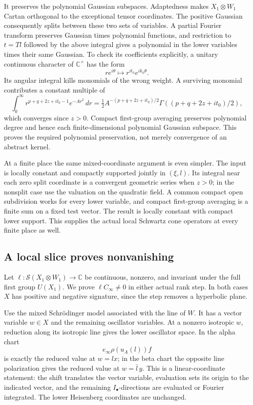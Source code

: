 It preserves the polynomial Gaussian subspaces.
Adaptedness makes \(X_1\otimes W_1\) Cartan orthogonal
to the exceptional tensor coordinates. The positive
Gaussian consequently splits between these two sets
of variables. A partial Fourier transform preserves
Gaussian times polynomial functions, and restriction
to \(t=Tl\) followed by the above integral gives
a polynomial in the lower variables times their
same Gaussian. To check its coefficients explicitly,
a unitary continuous character of \(\mathbb C^\times\)
has the form
\[
               r e^{i\theta}\longmapsto r^{i t_0}e^{i k_0\theta}.
\]
Its angular integral kills monomials of the wrong
weight. A surviving monomial contributes a constant
multiple of
\[
       \int_0^\infty
              r^{p+q+2z+i t_0-1}e^{-A r^2}\,dr
       =\tfrac12 A^{-(p+q+2z+i t_0)/2}
                          \Gamma((p+q+2z+i t_0)/2),
\]
which converges since \(z>0\).
Compact first-group averaging preserves polynomial
degree and hence each finite-dimensional polynomial
Gaussian subspace. This proves the required polynomial
preservation, not merely convergence of an abstract kernel.

At a finite place the same mixed-coordinate argument is
even simpler. The input is locally constant and compactly
supported jointly in \((\xi,l)\). Its integral near each
zero split coordinate is a convergent geometric series
when \(z>0\); in the nonsplit case use the valuation on
the quadratic field. A common compact open subdivision
works for every lower variable, and compact first-group
averaging is a finite sum on a fixed test vector.
The result is locally constant with compact lower
support. This supplies the actual local Schwartz cone
operators at every finite place as well.

\subsection{A local slice proves nonvanishing}

Let \(\ell:\mathcal S(X_1\otimes W_1)\to\mathbb C\)
be continuous, nonzero, and invariant under the full
first group \(U(X_1)\). We prove
\(\ell C_\infty\ne0\) in either actual rank step.
In both cases \(X\) has positive and negative
signature, since the step removes a hyperbolic plane.

Use the mixed Schr\"odinger model associated with the
line of \(W\). It has a vector variable \(w\in X\)
and the remaining oscillator variables. At a nonzero
isotropic \(w\), reduction along its isotropic line
gives the lower oscillator space. In the alpha chart
\[
             e_\infty\rho(u_A(l))f
\]
is exactly the reduced value at \(w=lx\); in the beta
chart the opposite line polarization gives the
reduced value at \(w=\bar l\,y\).
This is a linear-coordinate statement: the shift
translates the vector variable, evaluation sets its
origin to the indicated vector, and the remaining
\(I_\bullet\)-directions are evaluated or Fourier
integrated. The lower Heisenberg coordinates are
unchanged.

